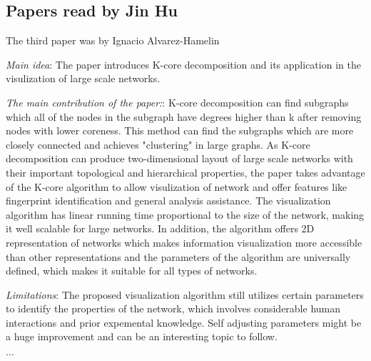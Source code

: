 \subsection{Papers read by Jin Hu}
The third paper was by Ignacio Alvarez-Hamelin
\begin{itemize*}
\item {\em Main idea}: The paper introduces K-core decomposition and its application in the visulization of large scale networks.
\item {\em The main contribution of the paper:}:
	K-core decomposition can find subgraphs which all of the nodes in the subgraph have degrees higher than k after removing nodes with lower coreness. This method can find the subgraphs which are more closely connected and achieves "clustering" in large graphs.
      As K-core decomposition can produce two-dimensional layout of large scale networks with their important topological and hierarchical properties, the paper takes advantage of the K-core algorithm to allow visulization of network and offer features like fingerprint identification and general analysis assistance. The visualization algorithm has linear running time proportional to the size of the network, making it well scalable for large networks. In addition, the algorithm offers 2D representation of networks which makes information visualization more accessible than other representations and the parameters of the algorithm are universally defined, which makes it suitable for all types of networks.
\item {\em Limitations}:
      The proposed visualization algorithm still utilizes certain parameters to identify the properties of the network, which involves considerable human interactions and prior expemental knowledge. Self adjusting parameters might be a huge improvement and can be an interesting topic to follow.
\end{itemize*}

$\ldots$

